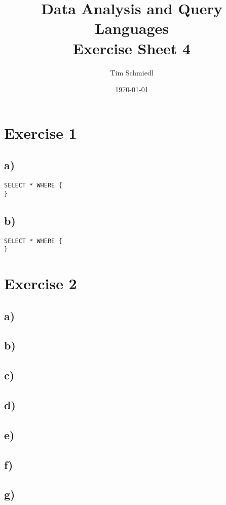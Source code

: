 \documentclass{article}
\begin{document}
\title{Data Analysis and Query Languages \\
 Exercise Sheet 4}
\date{\today}
\author{Tim Schmiedl} 
\maketitle

\section*{Exercise 1}
\subsection*{a)}
\begin{lstlisting}
SELECT * WHERE {
}
\end{lstlisting}

\vspace{1cm}
\subsection*{b)}
\begin{lstlisting}
SELECT * WHERE {
}
\end{lstlisting}

\vspace{2cm}
\section*{Exercise 2}
\subsection*{a)}

\vspace{1cm}
\subsection*{b)}

\vspace{1cm}
\subsection*{c)}

\vspace{1cm}
\subsection*{d)}

\vspace{1cm}
\subsection*{e)}

\vspace{1cm}
\subsection*{f)}

\vspace{1cm}
\subsection*{g)}
\end{document}
